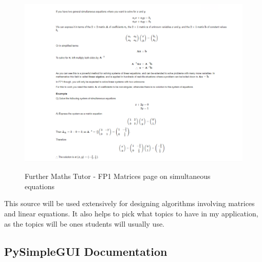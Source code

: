 \documentclass[final]{cmpreport}
\begin{document}
		\begin{figure}[H]
		\caption{Further Maths Tutor - FP1 Matrices page on simultaneous equations}
		\centering
		\includegraphics[scale=0.6]{furthermaths.png}
		\label{fig:further}
	\end{figure}
	
	This source will be used extensively for designing algorithms involving matrices and linear equations. It also helps to pick what topics to have in my application, as the topics will be ones students will usually use. 
	
	\subsection{PySimpleGUI Documentation} \label{sec:pysimple}
	
\end{document}
